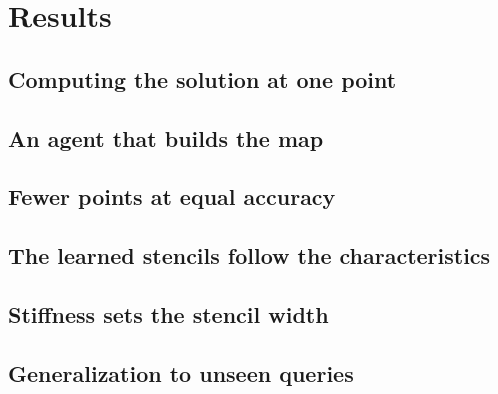 \documentclass[11pt]{article}
\begin{document}
\section*{Results}

\subsection*{Computing the solution at one point}
\label{sec:res-map}

\subsection*{An agent that builds the map}
\label{sec:res-agent}

\subsection*{Fewer points at equal accuracy}
\label{sec:res-cost}

\subsection*{The learned stencils follow the characteristics}
\label{sec:res-char}

\subsection*{Stiffness sets the stencil width}
\label{sec:res-stiff}

\subsection*{Generalization to unseen queries}
\label{sec:res-gen}

\end{document}
